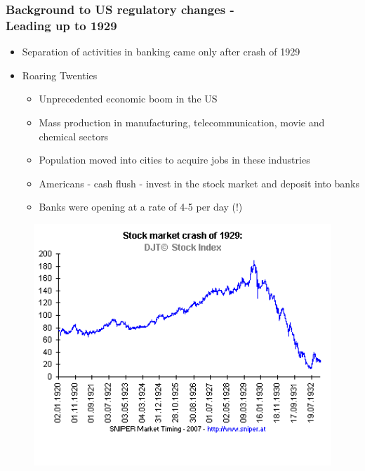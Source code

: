 \documentclass[11pt]{beamer}
\begin{document}

\begin{frame}
\frametitle{Background to US regulatory changes -\\ Leading up to 1929}
\begin{itemize}
  \item Separation of activities in banking came only after crash of 1929
\item Roaring Twenties
	\begin{itemize}
	\item Unprecedented economic boom in the US
    \item Mass production in manufacturing, telecommunication, movie and chemical sectors
    \item Population moved into cities to acquire jobs in these industries
    \item Americans - cash flush - invest in the stock market and deposit into banks
    \item Banks were opening at a rate of 4-5 per day (!)
	\end{itemize}

\end{itemize}

\end{frame}
\begin{frame}
\begin{figure}
	\includegraphics[width=1\textwidth]{Figures/Stockmarket.png}
\end{figure}

\end{frame}
\end{document}
